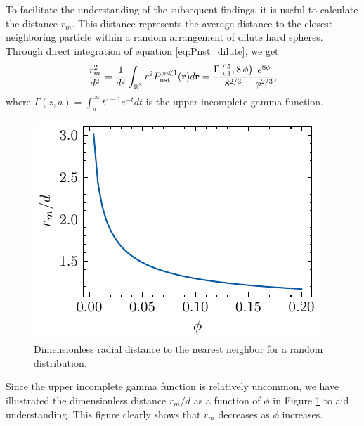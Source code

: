To facilitate the understanding of the subsequent findings, it is useful to calculate the distance $r_m$. 
This distance represents the average distance to the closest neighboring particle within a random arrangement of dilute hard spheres. 
Through direct integration of equation \ref{eq:Pnst_dilute}, we get
\begin{align}
    \frac{r_m^2}{d^2}
    = 
    \frac{1}{d^2}
    \int_{\mathbb{R}^3} r^2 P_\text{nst}^{\phi \ll 1}(\textbf{r}) d\textbf{r} 
    =  \frac{\Gamma\left({{5}\over{3}} , 8\,\phi\right)}{8^{2/3}}\frac{e^{8\phi}}{\phi^{2/3}},
\end{align}
where $\Gamma(z,a) = \int_a^\infty t^{z-1} e^{-t} dt$ is the upper incomplete gamma function.
\begin{figure}
  \centering
  \includegraphics[height = 0.3\textwidth]{image/HOMOGENEOUS_NEW/PA/rm.pdf}
  \caption{Dimensionless radial distance to the nearest neighbor for a random distribution.}
  \label{fig:agee}
\end{figure}
Since the upper incomplete gamma function is relatively uncommon, we have illustrated the dimensionless distance $r_m/d$ as a function of $\phi$ in Figure \ref{fig:agee} to aid understanding. This figure clearly shows that $r_m$ decreases as $\phi$ increases.

